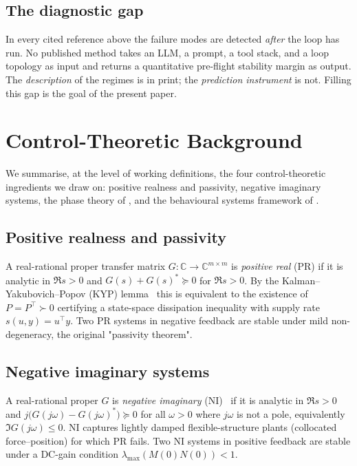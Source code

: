 \documentclass[11pt,a4paper]{article}
\theoremstyle{definition}
\theoremstyle{remark}
\newcommand{\C}{\mathbb{C}}
\newcommand{\T}{^{\!\top}}
\begin{document}
\subsection{The diagnostic gap}\label{ssec:gap}

In every cited reference above the failure modes are detected
\emph{after} the loop has run.  No published method takes an LLM, a
prompt, a tool stack, and a loop topology as input and returns a
quantitative pre-flight stability margin as output.  The
\emph{description} of the regimes is in print; the \emph{prediction
instrument} is not.  Filling this gap is the goal of the present paper.

\section{Control-Theoretic Background}\label{sec:background}

We summarise, at the level of working definitions, the four control-theoretic
ingredients we draw on: positive realness and passivity, negative imaginary
systems, the phase theory of \citet{Chen2023PhaseTheory}, and the behavioural
systems framework of \citet{Willems1986Behavioural}.

\subsection{Positive realness and passivity}\label{ssec:pr}

A real-rational proper transfer matrix $G:\C\to\C^{m\times m}$ is
\emph{positive real} (PR) if it is analytic in $\Re s>0$ and
$G(s)+G(s)^{*}\succeq 0$ for $\Re s>0$.  By the
Kalman--Yakubovich--Popov (KYP) lemma~\citep{Anderson1973NetworkAnalysis}
this is equivalent to the existence of $P=P\T \succ 0$ certifying a
state-space dissipation inequality with supply rate
$s(u,y)=u\T y$.  Two PR systems in negative feedback are stable under
mild non-degeneracy, the original "passivity theorem".

\subsection{Negative imaginary systems}\label{ssec:ni}

A real-rational proper $G$ is \emph{negative imaginary}
(NI)~\citep{Lanzon2008NI,Mabrok2014NIFoundations} if it is analytic in
$\Re s>0$ and $j\big(G(j\omega)-G(j\omega)^{*}\big)\succeq 0$ for all
$\omega>0$ where $j\omega$ is not a pole, equivalently
$\Im G(j\omega)\le 0$.  NI captures lightly damped flexible-structure
plants (collocated force--position) for which PR fails.  Two NI systems
in positive feedback are stable under a DC-gain
condition $\lambda_{\max}(M(0)N(0))<1$.
\end{document}
